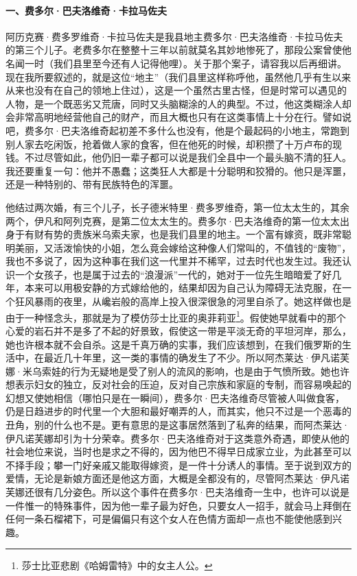 \paragraph*{一、费多尔·巴夫洛维奇·卡拉马佐夫}
\par 阿历克赛·费多罗维奇·卡拉马佐夫是我县地主费多尔·巴夫洛维奇·卡拉马佐夫的第三个儿子。老费多尔在整整十三年以前就莫名其妙地惨死了，那段公案曾使他名闻一时（我们县里至今还有人记得他哩）。关于那个案子，请容我以后再细讲。现在我所要叙述的，就是这位“地主”（我们县里这样称呼他，虽然他几乎有生以来从来也没有在自己的领地上住过），这是一个虽然古里古怪，但是时常可以遇见的人物，是一个既恶劣又荒唐，同时又头脑糊涂的人的典型。不过，他这类糊涂人却会非常高明地经营他自己的财产，而且大概也只有在这类事情上十分在行。譬如说吧，费多尔·巴夫洛维奇起初差不多什么也没有，他是个最起码的小地主，常跑到别人家去吃闲饭，抢着做人家的食客，但在他死的时候，却积攒了十万卢布的现钱。不过尽管如此，他仍旧一辈子都可以说是我们全县中一个最头脑不清的狂人。我还要重复一句：他并不愚蠢；这类狂人大都是十分聪明和狡猾的。他只是浑噩，还是一种特别的、带有民族特色的浑噩。
\par 他结过两次婚，有三个儿子，长子德米特里·费多罗维奇，第一位太太生的，其余两个，伊凡和阿列克赛，是第二位太太生的。费多尔·巴夫洛维奇的第一位太太出身于有财有势的贵族米乌索夫家，也是我们县里的地主。一个富有嫁资，既非常聪明美丽，又活泼愉快的小姐，怎么竟会嫁给这种像人们常叫的，不值钱的“废物”，我也不多说了，因为这种事在我们这一代里并不稀罕，过去时代也发生过。我还认识一个女孩子，也是属于过去的“浪漫派”一代的，她对于一位先生暗暗爱了好几年，本来可以用极安静的方式嫁给他的，结果却因为自己认为障碍无法克服，在一个狂风暴雨的夜里，从巉岩般的高岸上投入很深很急的河里自杀了。她这样做也是由于一种怪念头，那就是为了模仿莎士比亚的奥菲莉亚\footnote{莎士比亚悲剧《哈姆雷特》中的女主人公。}。假使她早就看中的那个心爱的岩石并不是多了不起的好景致，假使这一带是平淡无奇的平坦河岸，那么，她也许根本就不会自杀。这是千真万确的实事，我们应该想到，在我们俄罗斯的生活中，在最近几十年里，这一类的事情的确发生了不少。所以阿杰莱达·伊凡诺芙娜·米乌索娃的行为无疑地是受了别人的流风的影响，也是由于气愤所致。她也许想表示妇女的独立，反对社会的压迫，反对自己宗族和家庭的专制，而容易唤起的幻想又使她相信（哪怕只是在一瞬间），费多尔·巴夫洛维奇尽管被人叫做食客，仍是日趋进步的时代里一个大胆和最好嘲弄的人，而其实，他只不过是一个恶毒的丑角，别的什么也不是。更有意思的是这事居然落到了私奔的结果，而阿杰莱达·伊凡诺芙娜却引为十分荣幸。费多尔·巴夫洛维奇对于这类意外奇遇，即使从他的社会地位来说，当时也是求之不得的，因为他巴不得早日成家立业，为此甚至可以不择手段；攀一门好亲戚又能取得嫁资，是一件十分诱人的事情。至于说到双方的爱情，无论是新娘方面还是他这方面，大概是全都没有的，尽管阿杰莱达·伊凡诺芙娜还很有几分姿色。所以这个事件在费多尔·巴夫洛维奇一生中，也许可以说是一件惟一的特殊事件，因为他一辈子最为好色，只要女人一招手，就会马上拜倒在任何一条石榴裙下，可是偏偏只有这个女人在色情方面却一点也不能使他感到兴趣。
